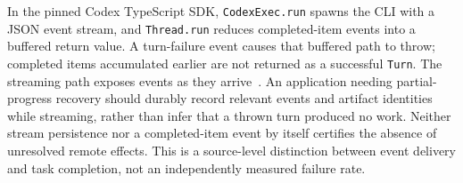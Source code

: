 In the pinned Codex TypeScript SDK, \texttt{CodexExec.run} spawns the CLI with a JSON event stream, and \texttt{Thread.run} reduces completed-item events into a buffered return value. A turn-failure event causes that buffered path to throw; completed items accumulated earlier are not returned as a successful \texttt{Turn}. The streaming path exposes events as they arrive~\cite{cumb2026codexsdk}. An application needing partial-progress recovery should durably record relevant events and artifact identities while streaming, rather than infer that a thrown turn produced no work. Neither stream persistence nor a completed-item event by itself certifies the absence of unresolved remote effects. This is a source-level distinction between event delivery and task completion, not an independently measured failure rate.

